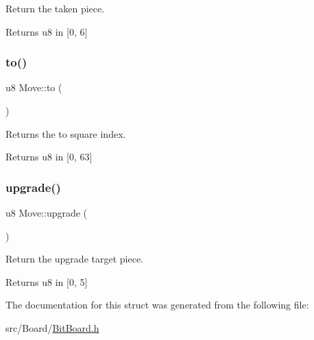 Return the taken piece. 

\begin{DoxyReturn}{Returns}
u8 in \mbox{[}0, 6\mbox{]} 
\end{DoxyReturn}
\mbox{\label{structMove_a1f98980b97696e23b58b8aaa0c3ee51e}} 
\subsubsection{\texorpdfstring{to()}{to()}}
{\footnotesize\ttfamily u8 Move\+::to (\begin{DoxyParamCaption}{ }\end{DoxyParamCaption})\hspace{0.3cm}{\ttfamily [inline]}}



Returns the to square index. 

\begin{DoxyReturn}{Returns}
u8 in \mbox{[}0, 63\mbox{]} 
\end{DoxyReturn}
\mbox{\label{structMove_afd8094aef3ce72c43e6635063c3f9bfd}} 
\subsubsection{\texorpdfstring{upgrade()}{upgrade()}}
{\footnotesize\ttfamily u8 Move\+::upgrade (\begin{DoxyParamCaption}{ }\end{DoxyParamCaption})\hspace{0.3cm}{\ttfamily [inline]}}



Return the upgrade target piece. 

\begin{DoxyReturn}{Returns}
u8 in \mbox{[}0, 5\mbox{]} 
\end{DoxyReturn}


The documentation for this struct was generated from the following file\+:\begin{DoxyCompactItemize}
\item 
src/\+Board/\hyperlink{BitBoard_8h}{Bit\+Board.\+h}\end{DoxyCompactItemize}
